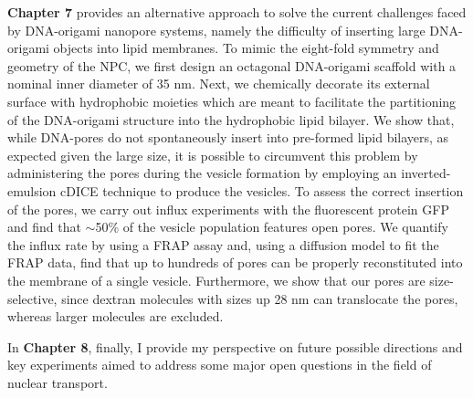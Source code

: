 \noindent \textbf{Chapter 7} provides an alternative approach to solve the current challenges faced by DNA-origami nanopore systems, namely the difficulty of inserting large DNA-origami objects into lipid membranes. To mimic the eight-fold symmetry and geometry of the NPC, we first design an octagonal DNA-origami scaffold with a nominal inner diameter of 35 nm. Next, we chemically decorate its external surface with hydrophobic moieties which are meant to facilitate the partitioning of the DNA-origami structure into the hydrophobic lipid bilayer. We show that, while DNA-pores do not spontaneously insert into pre-formed lipid bilayers, as expected given the large size, it is possible to circumvent this problem by administering the pores during the vesicle formation by employing an inverted-emulsion cDICE technique to produce the vesicles. To assess the correct insertion of the pores, we carry out influx experiments with the fluorescent protein GFP and find that $\sim$50\% of the vesicle population features open pores. We quantify the influx rate by using a FRAP assay and, using a diffusion model to fit the FRAP data, find that up to hundreds of pores can be properly reconstituted into the membrane of a single vesicle. Furthermore, we show that our pores are size-selective, since dextran molecules with sizes up 28 nm can translocate the pores, whereas larger molecules are excluded.

\noindent In \textbf{Chapter 8}, finally, I provide my perspective on future possible directions and key experiments aimed to address some major open questions in the field of nuclear transport.

\newpage


